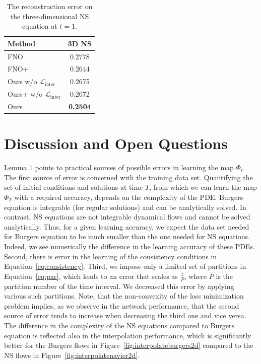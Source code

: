 \documentclass{article}
\theoremstyle{plain}
\theoremstyle{definition}
\theoremstyle{remark}
\newcommand{\linter}{{{\mathcal{L}}_{\text{inter}}}}
\begin{document}
\begin{table}[t]
\caption{The reconstruction error on the three-dimensional NS equation at $t=1$.}
\label{tab:3dresults}
\begin{center}
\begin{tabular}{lc}
\toprule
                                   Method & 3D NS \\
\midrule
                                      FNO &           0.2778 \\
                                      FNO+  & 0.2644 \\
                               Ours w/o $\linter$ & 0.2675 \\
                               Ours+ w/o $\linter$  &  0.2672 \\
                               Ours  &  \textbf{0.2504} \\
                               
\bottomrule
\end{tabular}
\end{center}
\end{table}






\section{Discussion and Open Questions}

Lemma 1 points to practical sources of possible errors in learning the 
map $\Phi_t$. The first source of error is concerned with the training 
data set. Quantifying the set of initial conditions and solutions at time $T$, from which we can learn the map $\Phi_T$ with a required accuracy, depends on the complexity of the PDE. Burgers equation is integrable (for regular solutions) and can be analytically solved.
In contrast, NS equations are not integrable dynamical flows and cannot be solved analytically. Thus, for a given learning accuracy, we expect the data set needed for Burgers equation to be much smaller than the one needed for NS equations. Indeed, we see numerically the difference in the learning accuracy of these PDEs.
Second, there is error in the learning of the consistency conditions in Equation~\eqref{eq:consistency}. 
Third, we impose only a limited set of partitions in Equation~\eqref{eq:par}, which leads to an error that scales as $\frac{1}{P}$, where $P$ is the partition number of the time interval. We decreased this error by applying various such partitions. 
Note, that the non-convexity of the loss minimization problem implies, as we observe in the network performance, that the second source of error tends to increase when decreasing the third one and vice versa.
The difference in the complexity of the NS equations compared
to Burgers equation is reflected also in the interpolation performance, which is significantly better
for the Burgers flows in Figure~\ref{fig:interpolateburgers2d} compared to the NS flows in Figure~\ref{fig:interpolatenavier2d}.
\end{document}

